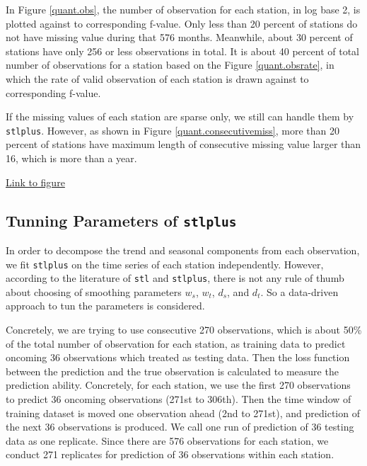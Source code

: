 In Figure \href{../plots/a1950/a1950.obs.station.pdf}{\ref*{quant.obs}}, the 
number of observation for each station, in log base 2, is plotted against to 
corresponding f-value. Only less than 20 percent of stations do not have missing
value during that 576 months. Meanwhile, about 30 percent of stations have only
256 or less observations in total. It is about 40 percent of total number of 
observations for a station based on the Figure 
\href{../plots/a1950/a1950.obsrate.station.pdf}{\ref*{quant.obsrate}}, in which 
the rate of valid observation of each station is drawn against to corresponding 
f-value.

If the missing values of each station are sparse only, we still can handle them 
by \texttt{stlplus}. However, as shown in Figure 
\href{../plots/a1950/a1950.consecutive.miss.station.pdf}{\ref*{quant.consecutivemiss}},
more than 20 percent of stations have maximum length of consecutive missing value 
larger than 16, which is more than a year. 

\begin{framed}
\begin{center}
  \href{../plots/a1950/a1950.consecutive.miss.station.pdf}{Link to figure}
  \label{quant.consecutivemiss}
\end{center}
\end{framed}

\subsection{Tunning Parameters of \texttt{stlplus}}

In order to decompose the trend and seasonal components from each observation, we 
fit \texttt{stlplus} on the time series of each station independently. However,
according to the literature of \texttt{stl} and \texttt{stlplus}, there is not 
any rule of thumb about choosing of smoothing parameters $w_s$, $w_t$, $d_s$, and 
$d_t$. So a data-driven approach to tun the parameters is considered. 

Concretely, we are trying to use consecutive 270 observations, which is about 
50\% of the total number of observation for each station, as training 
data to predict oncoming 36 observations which treated as testing data. Then the 
loss function between the prediction and the true observation is calculated to 
measure the prediction ability. Concretely, for 
each station, we use the first 270 observations to predict 36 oncoming 
observations (271st to 306th). Then the time window of training dataset is moved 
one observation ahead (2nd to 271st), and prediction of the next 36 observations 
is produced. We call one run of prediction of 36 testing data as one replicate. 
Since there are 576 observations for each station, we conduct 271 replicates for 
prediction of 36 observations within each station.

